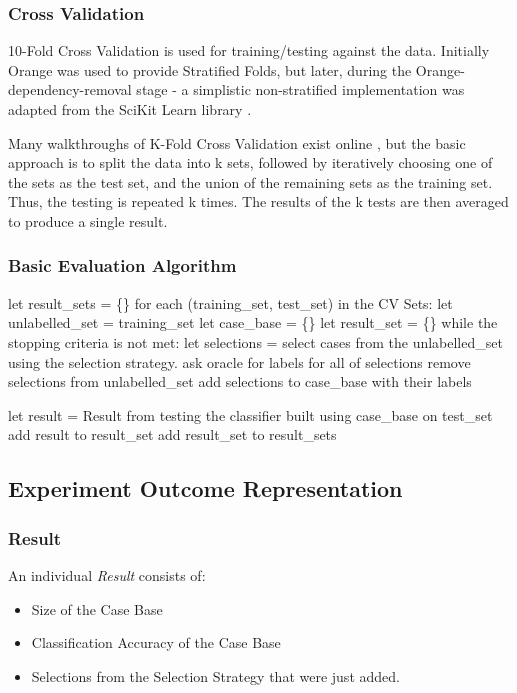 \documentclass[a4paper,11pt]{report}
\begin{document}
\subsubsection{Cross Validation}

10-Fold Cross Validation is used for training/testing against the data. Initially Orange was used to provide Stratified Folds, but later, during the Orange-dependency-removal stage - a simplistic non-stratified implementation was adapted from the SciKit Learn library \citep{prog:sklearn}.

Many walkthroughs of K-Fold Cross Validation exist online \citep{web:kfolddemo}, but the basic approach is to split the data into k sets, followed by iteratively choosing one of the sets as the test set, and the union of the remaining sets as the training set. Thus, the testing is repeated k times. The results of the k tests are then averaged to produce a single result.

\subsubsection{Basic Evaluation Algorithm}
\begin{code}
let result_sets = \{\}
for each (training_set, test_set) in the CV Sets:
  let unlabelled_set = training_set
  let case_base = \{\}
  let result_set = \{\}
  while the stopping criteria is not met:
    let selections = select cases from the 
                     unlabelled_set using the 
                     selection strategy.
    ask oracle for labels for all of selections
    remove selections from unlabelled_set
    add selections to case_base with their labels
  
    let result = Result from testing the classifier
                 built using case_base on test_set
    add result to result_set
  add result_set to result_sets
\end{code}

\subsection{Experiment Outcome Representation}
\subsubsection{Result}
An individual \emph{Result} consists of:
\begin{itemize}
	\item Size of the Case Base
	\item Classification Accuracy of the Case Base
	\item Selections from the Selection Strategy that were just added.
\end{itemize}
\end{document}
